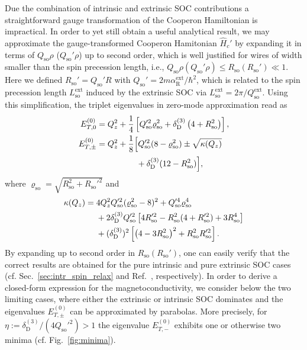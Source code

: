\documentclass[superscriptaddress,noshowpacs,noshowkeys, twocolumn, floatfix,aps, prb,reprint]{revtex4-1}
\begin{document}
Due the combination of intrinsic and extrinsic SOC contributions a straightforward gauge transformation of the Cooperon Hamiltonian is impractical.
In order to yet still obtain a useful analytical result, we may approximate the gauge-transformed Cooperon Hamitonian $\hat{H}_c'$ by expanding it in terms of $Q_\text{so}\rho$ ($Q_\text{so}'\rho$) up to second order, which is well justified for wires of width smaller than the spin precession length, i.e., $Q_\text{so}\rho(Q_\text{so}'\rho)\leq R_\text{so}(R_\text{so}')\ll 1$.
Here we defined $R_\text{so}'=Q_\text{so}'R$ with $Q_\text{so}'=2m\alpha_\text{R}^\text{ext}/\hbar^2$, which is related to the spin precession length $L_\text{so}^\text{ext}$ induced by the extrinsic SOC via $L_\text{so}^\text{ext}=2\pi/Q_\text{so}^\text{ext}$.
Using this simplification, the triplet eigenvalues in zero-mode approximation read as
%
\begin{align}
E^{(0)}_{T,0}={}&Q_z^2+\frac{1}{4}\left[Q_\text{so}'^2\varrho_\text{so}^2+\delta_\text{D}^{(3)}\left(4+R_\text{so}^2\right)\right],\label{EV2}\\
E^{(0)}_{T,\pm}={}&Q_z^2+\frac{1}{8}\Big[Q_\text{so}'^2(8-\varrho_\text{so}^2)\pm\sqrt{\kappa(Q_z)}\notag\\
&\phantom{Q_z^2+\frac{1}{8}[}+\delta_\text{D}^{(3)}(12-R_\text{so}^2)\Big]\label{EV3},
\end{align}
%
where $\varrho_\text{so}=\sqrt{R_\text{so}^2+R_\text{so}'^2}$ and
%
\begin{align}
\kappa(Q_z)={}&4Q_z^2 Q_\text{so}'^2(\varrho_\text{so}^2-8)^2+Q_\text{so}'^4\varrho_\text{so}^4\notag\\
&+2\delta_\text{D}^{(3)}Q_\text{so}'^2\left[4R_\text{so}'^2-R_\text{so}^2(4+R_\text{so}'^2)+3R_\text{so}^4\right]\notag\\
&+(\delta_\text{D}^{(3)})^2
\left[\left(4-3 R_\text{so}^2\right)^2+R_\text{so}^2R_\text{so}'^2\right].
\end{align}
%
By expanding up to second order in $R_\text{so}(R_\text{so}')$, one can easily verify that the correct results are obtained for the pure intrinsic and pure extrinsic SOC cases (cf. Sec.~\ref{sec:intr_spin_relax} and Ref.~, respectively).
In order to derive a closed-form expression for the magnetoconductivity, we consider below the two limiting cases, where either the extrinsic or intrinsic SOC dominates and the eigenvalues $E^{(0)}_{T,\pm}$ can be approximated by parabolas.
More precisely, for $\eta:=\delta_\text{D}^{(3)}/(4Q_\text{so}'^2)>1$ the eigenvalue $E^{(0)}_{T,-}$ exhibits one or otherwise two  minima (cf. Fig.~\ref{fig:minima}).
\end{document}
